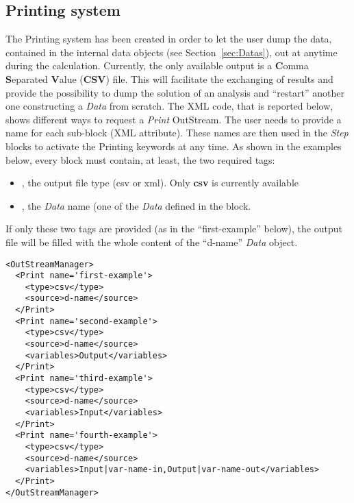 \subsection{Printing system \label{sec:printing}}
The Printing system has been created in order to let the user dump the data,
contained in the internal data objects (see Section~\ref{sec:Datas}), out
at anytime during the calculation.
%
Currently, the only available output is a \textbf{C}omma \textbf{S}eparated
\textbf{V}alue (\textbf{CSV}) file.
%
%
This will facilitate the exchanging of results and provide the possibility to
dump the solution of an analysis and ``restart'' another one constructing a
\textit{Data} from scratch.
%
The XML code, that is reported below, shows different ways to request a
\textit{Print} OutStream.
%
The user needs to provide a name for each sub-block (XML attribute).
%
These names are then used in the \textit{Step} blocks to activate the Printing
keywords at any time.
%
As shown in the examples below, every  block must contain, at
least, the two required tags:
\vspace{-5mm}
\begin{itemize}
  \itemsep0em
  \item {}, the output file type (csv or xml).
  \nb Only \textbf{csv} is currently available
  \item {}, the \textit{Data} name (one of the \textit{Data} 
  defined in the  block.
\end{itemize}
\vspace{-5mm}
If only these two tags are provided (as in the ``first-example'' below), the
output file will be filled with the whole content of the ``d-name''
\textit{Data} object.
%
\begin{lstlisting}[style=XML]
<OutStreamManager>
  <Print name='first-example'>
    <type>csv</type>
    <source>d-name</source>
  </Print>
  <Print name='second-example'>
    <type>csv</type>
    <source>d-name</source>
    <variables>Output</variables>
  </Print>
  <Print name='third-example'>
    <type>csv</type>
    <source>d-name</source>
    <variables>Input</variables>
  </Print>
  <Print name='fourth-example'>
    <type>csv</type>
    <source>d-name</source>
    <variables>Input|var-name-in,Output|var-name-out</variables>
  </Print>
</OutStreamManager>
\end{lstlisting}

